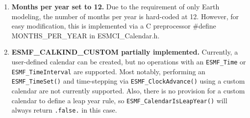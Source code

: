 
\label{subsec:Calendar_rest}

\begin{enumerate}

\item {\bf Months per year set to 12.} Due to the requirement of only Earth modeling, the number of months per year is hard-coded at 12.  However, for easy modification, this is implemented via a C preprocessor \#define MONTHS\_PER\_YEAR in ESMCI\_Calendar.h.

\item {\bf ESMF\_CALKIND\_CUSTOM partially implemented.} Currently, a user-defined calendar can be created, but no operations with an {\tt ESMF\_Time} or {\tt ESMF\_TimeInterval} are supported.  Most notably, performing an {\tt ESMF\_TimeSet()} and time-stepping via {\tt ESMF\_ClockAdvance()} using a custom calendar are not currently supported.  Also, there is no provision for a custom calendar to define a leap year rule, so {\tt ESMF\_CalendarIsLeapYear()} will always return {\tt .false.} in this case.

\end{enumerate}
